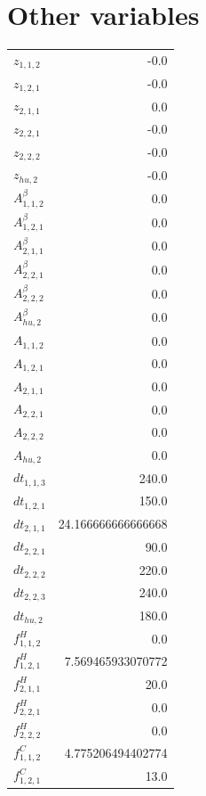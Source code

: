 \documentclass{article}%
\makeatletter
\let\mcnewpage=\newpage%
\newcommand{\TrickSupertabularIntoMulticols}{%
\renewcommand\newpage{%
\if@firstcolumn%
\hrule width\linewidth height0pt%
\columnbreak%
\else%
\mcnewpage%
\fi%
}%
}%
\makeatother
\begin{document}
\section{Other variables}%
\thispagestyle{plain}%
\begin{multicols*}{3}%
\TrickSupertabularIntoMulticols%
%
\begin{supertabular}{lr}%
	$z_{1,1,2}$ & -0.0 \\%
	$z_{1,2,1}$ & -0.0 \\%
	$z_{2,1,1}$ & 0.0 \\%
	$z_{2,2,1}$ & -0.0 \\%
	$z_{2,2,2}$ & -0.0 \\%
	$z_{hu,2}$ & -0.0 \\%
	$A_{1,1,2}^{\beta}$ & 0.0 \\%
	$A_{1,2,1}^{\beta}$ & 0.0 \\%
	$A_{2,1,1}^{\beta}$ & 0.0 \\%
	$A_{2,2,1}^{\beta}$ & 0.0 \\%
	$A_{2,2,2}^{\beta}$ & 0.0 \\%
	$A_{hu,2}^{\beta}$ & 0.0 \\%
	$A_{1,1,2}$ & 0.0 \\%
	$A_{1,2,1}$ & 0.0 \\%
	$A_{2,1,1}$ & 0.0 \\%
	$A_{2,2,1}$ & 0.0 \\%
	$A_{2,2,2}$ & 0.0 \\%
	$A_{hu,2}$ & 0.0 \\%
	$dt_{1,1,3}$ & 240.0 \\%
	$dt_{1,2,1}$ & 150.0 \\%
	$dt_{2,1,1}$ & 24.166666666666668 \\%
	$dt_{2,2,1}$ & 90.0 \\%
	$dt_{2,2,2}$ & 220.0 \\%
	$dt_{2,2,3}$ & 240.0 \\%
	$dt_{hu,2}$ & 180.0 \\%
	$f_{1,1,2}^{H}$ & 0.0 \\%
	$f_{1,2,1}^{H}$ & 7.569465933070772 \\%
	$f_{2,1,1}^{H}$ & 20.0 \\%
	$f_{2,2,1}^{H}$ & 0.0 \\%
	$f_{2,2,2}^{H}$ & 0.0 \\%
	$f_{1,1,2}^{C}$ & 4.775206494402774 \\%
	$f_{1,2,1}^{C}$ & 13.0 \\%

\end{supertabular}
\end{multicols*}
\end{document}
